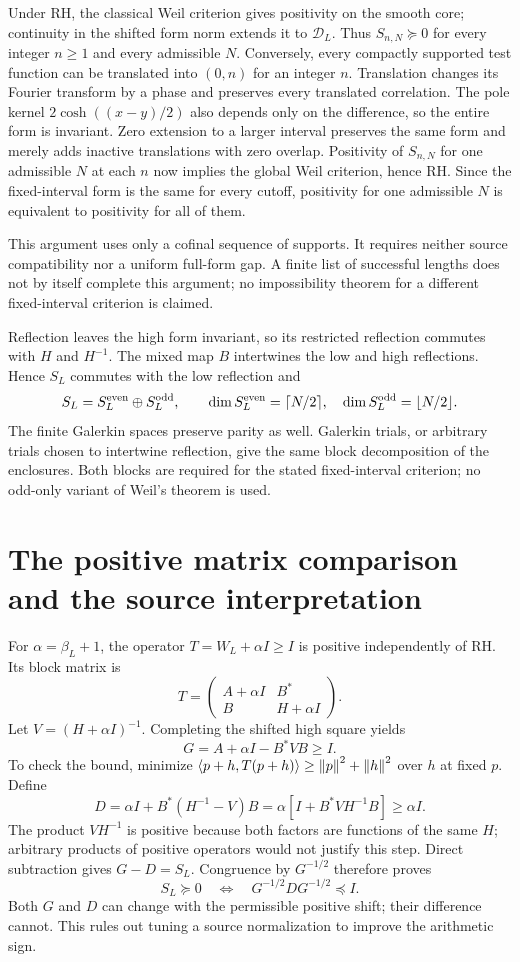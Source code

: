 Under RH, the classical Weil criterion gives positivity on the smooth
core; continuity in the shifted form norm extends it to $\mathcal D_L$.
Thus $S_{n,N}\succeq0$ for every integer $n\ge1$ and every admissible $N$.
Conversely, every compactly supported test function can be translated into
$(0,n)$ for an integer $n$. Translation changes its Fourier transform by
a phase and preserves every translated correlation. The pole kernel
$2\cosh((x-y)/2)$ also depends only on the difference, so the entire form
is invariant. Zero extension to a larger interval preserves the same
form and merely adds inactive translations with zero overlap. Positivity
of $S_{n,N}$ for one admissible $N$ at each $n$ now implies the global
Weil criterion, hence RH. Since the fixed-interval form is the same for
every cutoff, positivity for one admissible $N$ is equivalent to positivity
for all of them.

This argument uses only a cofinal sequence of supports. It requires
neither source compatibility nor a uniform full-form gap. A finite list
of successful lengths does not by itself complete this argument; no
impossibility theorem for a different fixed-interval criterion is claimed.

Reflection leaves the high form invariant, so its restricted reflection
commutes with $H$ and $H^{-1}$. The mixed map $B$ intertwines the low and
high reflections. Hence $S_L$ commutes with the low reflection and
\[
S_L=S_L^{\rm even}\oplus S_L^{\rm odd},\qquad
\dim S_L^{\rm even}=\lceil N/2\rceil,\quad
\dim S_L^{\rm odd}=\lfloor N/2\rfloor.
\]
The finite Galerkin spaces preserve parity as well. Galerkin trials, or
arbitrary trials chosen to intertwine reflection, give the same block
decomposition of the enclosures. Both blocks are required for the stated
fixed-interval criterion; no odd-only variant of Weil's theorem is used.

\section{The positive matrix comparison and the source interpretation}
For $\alpha=\beta_L+1$, the operator $T=W_L+\alpha I\ge I$ is positive
independently of RH. Its block matrix is
\[
T=\begin{pmatrix}A+\alpha I&B^*\\B&H+\alpha I\end{pmatrix}.
\]
Let $V=(H+\alpha I)^{-1}$. Completing the shifted high square yields
\[
G=A+\alpha I-B^*VB\ge I.
\]
To check the bound, minimize $\left\langle p+h,T(p+h)\right\rangle\ge\left\lVert p\right\rVert^2+\left\lVert h\right\rVert^2$
over $h$ at fixed $p$. Define
\[
D=\alpha I+B^*(H^{-1}-V)B
=\alpha[I+B^*VH^{-1}B]\ge\alpha I.
\]
The product $VH^{-1}$ is positive because both factors are functions of
the same $H$; arbitrary products of positive operators would not justify
this step. Direct subtraction gives $G-D=S_L$. Congruence by $G^{-1/2}$
therefore proves
\begin{equation}\label{d:contraction}
S_L\succeq0\quad\Longleftrightarrow\quad
G^{-1/2}DG^{-1/2}\preceq I.
\end{equation}
Both $G$ and $D$ can change with the permissible positive shift; their
difference cannot. This rules out tuning a source normalization to improve
the arithmetic sign.

